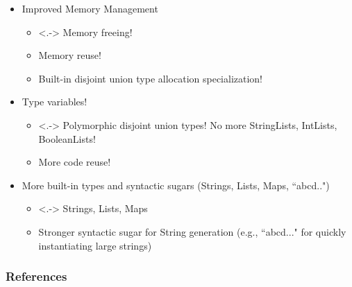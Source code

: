 \documentclass{beamer}
\begin{document}
\begin{frame}

\begin{itemize}
 \item<1-> Improved Memory Management
 \begin{itemize}
  \item<.-> Memory freeing!
  \item Memory reuse!
  \item Built-in disjoint union type allocation specialization!
 \end{itemize}

 \item<2-> Type variables!
 \begin{itemize}
  \item<.-> Polymorphic disjoint union types! No more StringLists, IntLists, BooleanLists!
  \item More code reuse!
 \end{itemize}
 
 \item<3-> More built-in types and syntactic sugars (Strings, Lists, Maps, ``abcd..")
 \begin{itemize}
 \item<.-> Strings, Lists, Maps
 \item Stronger syntactic sugar for String generation (e.g., ``abcd..." for quickly instantiating large strings)
 \end{itemize}

\end{itemize}

\end{frame}

\begin{frame}
\frametitle{References}
\end{frame}
\end{document}
